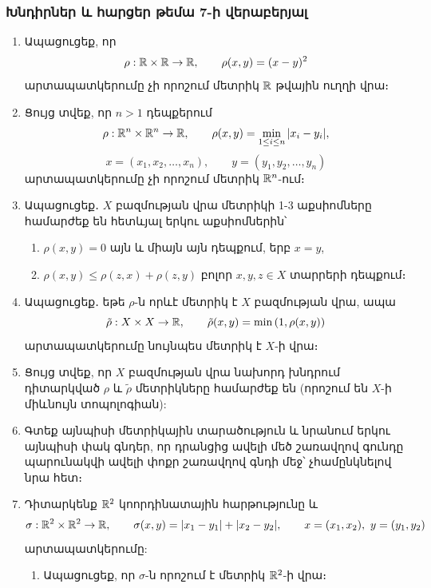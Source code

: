 \bigskip
\bigskip
\subsubsection*{Խնդիրներ և հարցեր թեմա 7-ի վերաբերյալ}

\begin{enumerate}[label=\thesection.\arabic*.]
\item Ապացուցեք, որ $$\rho : \mathbb{R} \times \mathbb{R} \to \mathbb{R}, \qquad \rho(x,y)=(x-y)^2$$ արտապատկերումը չի որոշում մետրիկ $\mathbb{R}$ թվային ուղղի վրա։ 

\item Ցույց տվեք, որ $n>1$ դեպքերում 
\[
\rho: \mathbb{R}^n \times \mathbb{R}^n \to \mathbb{R}, \qquad \rho(x, y ) = \min_{1\le i \le n} |x_i-y_i|,
\]
\[
x=(x_1, x_2, \dots, x_n),\qquad y=(y_1, y_2, \dots, y_n)
\] 
արտապատկերումը չի որոշում մետրիկ $\mathbb{R}^n$-ում։

\item Ապացուցեք․ $X$ բազմության վրա մետրիկի 1-3 աքսիոմները համարժեք են հետևյալ 
երկու աքսիոմներին՝
\begin{enumerate}
\item[1.] $\rho(x,y)=0$ այն և միայն այն դեպքում, երբ $x=y$,
\item[2.] $\rho(x,y) \le \rho(z,x)+\rho(z,y)$ բոլոր $x, y, z \in X$ տարրերի դեպքում։
\end{enumerate}


\item Ապացուցեք․ եթե $\rho$-ն որևէ մետրիկ է $X$ բազմության վրա, ապա 
\[
\tilde{\rho} : X \times X \to \mathbb{R},
\qquad 
\tilde{\rho}(x,y) = \min\left(1, \rho(x,y)\right)
\]
արտապատկերումը նույնպես մետրիկ է $X$-ի վրա։ 

\item Ցույց տվեք, որ $X$ բազմության վրա նախորդ խնդրում դիտարկված $\rho$ և $\tilde{\rho}$ մետրիկները համարժեք են (որոշում են $X$-ի միևնույն տոպոլոգիան):

\item Գտեք այնպիսի մետրիկային տարածություն և նրանում երկու այնպիսի փակ գնդեր, որ դրանցից ավելի մեծ շառավղով գունդը պարունակվի ավելի փոքր շառավղով գնդի մեջ՝ չհամընկնելով նրա հետ։

\item Դիտարկենք $\mathbb{R}^2$ կոորդինատային հարթությունը և
\[
\sigma: \mathbb{R}^2 \times \mathbb{R}^2 \to \mathbb{R}, \qquad \sigma(x, y ) = |x_1-y_1|+|x_2-y_2|, \qquad
x=(x_1, x_2),\ y=(y_1, y_2)
\]
արտապատկերումը:
\begin{enumerate}
\item[ա)] Ապացուցեք, որ $\sigma$-ն որոշում է մետրիկ $\mathbb{R}^2$-ի վրա։


\end{enumerate}
\end{enumerate}
